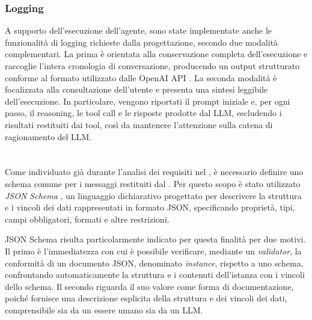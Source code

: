 
\subsubsection{Logging}

A supporto dell'esecuzione dell'agente, sono state implementate anche le funzionalità di logging richieste dalla progettazione, secondo due modalità complementari. La prima è orientata alla conservazione completa dell'esecuzione e raccoglie l'intera cronologia di conversazione, producendo un output strutturato conforme al formato utilizzato dalle OpenAI API \cite{openai2026apidocs}. La seconda modalità è focalizzata alla consultazione dell'utente e presenta una sintesi leggibile dell'esecuzione. In particolare, vengono riportati il prompt iniziale e, per ogni passo, il reasoning, le tool call e le risposte prodotte dal LLM, escludendo i risultati restituiti dai tool, così da mantenere l'attenzione sulla catena di ragionamento del LLM.



\section{\schema{}} \label{sec:schema} %

Come individuato già durante l'analisi dei requisiti nel , è necessario definire uno schema comune per i messaggi restituiti dal \capture{}. Per questo scopo è stato utilizzato \emph{JSON Schema} \cite{jsonschema2020json}, un linguaggio dichiarativo progettato per descrivere la struttura e i vincoli dei dati rappresentati in formato JSON, specificando proprietà, tipi, campi obbligatori, formati e altre restrizioni.


JSON Schema risulta particolarmente indicato per questa finalità per due motivi. Il primo è l'immediatezza con cui è possibile verificare, mediante un \emph{validator}, la conformità di un documento JSON, denominato \emph{instance}, rispetto a uno schema, confrontando automaticamente la struttura e i contenuti dell'istanza con i vincoli dello schema. Il secondo riguarda il suo valore come forma di documentazione, poiché fornisce una descrizione esplicita della struttura e dei vincoli dei dati, comprensibile sia da un essere umano sia da un LLM.

